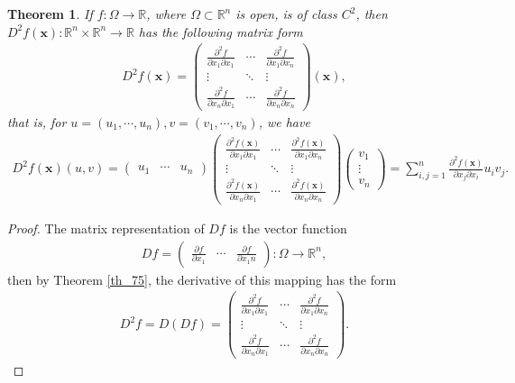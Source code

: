 \documentclass[10pt]{book}
\newtheorem{theorem}{Theorem}[chapter]
\theoremstyle{definition}
\numberwithin{equation}{chapter}
\begin{document}
\begin{theorem}\label{th_719}
If $f: \Omega \to \mathbb{R}$, where $\Omega \subset \mathbb{R}^n$ is open, is of class $C^2$, then $D^2f(\mathbf{x}): \mathbb{R}^n \times \mathbb{R}^n \to \mathbb{R}$ has the following matrix form
\begin{align*}
    D^2f(\mathbf{x}) = \begin{pmatrix}
        \frac{\partial^2 f}{\partial x_1 \partial x_1} & \cdots & \frac{\partial^2 f}{\partial x_1 \partial x_n} \\
        \vdots & \ddots & \vdots \\
        \frac{\partial^2 f}{\partial x_n \partial x_1} & \cdots & \frac{\partial^2 f}{\partial x_n \partial x_n}
    \end{pmatrix}(\mathbf{x}),
\end{align*}
that is, for $u = (u_1, \cdots, u_n),  v = (v_1, \cdots, v_n)$, we have
\begin{align*}
    D^2f(\mathbf{x})(u,v) = \begin{pmatrix}
        u_1 & \cdots & u_n    
    \end{pmatrix} 
    \begin{pmatrix}
        \frac{\partial^2 f(\mathbf{x})}{\partial x_1 \partial x_1} & \cdots & \frac{\partial^2 f(\mathbf{x})}{\partial x_1 \partial x_n} \\
        \vdots & \ddots & \vdots \\
        \frac{\partial^2 f(\mathbf{x})}{\partial x_n \partial x_1} & \cdots & \frac{\partial^2 f(\mathbf{x})}{\partial x_n \partial x_n}
    \end{pmatrix} 
    \begin{pmatrix}
        v_1 \\
        \vdots \\
        v_n
    \end{pmatrix} = \sum^n_{i,j=1} \frac{\partial^2 f(\mathbf{x})}{\partial x_j \partial x_i} u_i v_j.
\end{align*}
\end{theorem}
\begin{proof}
The matrix representation of $Df$ is the vector function
\begin{align*}
    Df = \begin{pmatrix}
        \frac{\partial f}{\partial x_1} & \cdots & \frac{\partial f}{\partial x_1n}
    \end{pmatrix}: \Omega \to \mathbb{R}^n,
\end{align*}
then by Theorem \ref{th_75}, the derivative of this mapping has the form
\begin{align}\label{th_719_equ1}
    D^2f = D(Df) = \begin{pmatrix}
        \frac{\partial^2 f}{\partial x_1 \partial x_1} & \cdots & \frac{\partial^2 f}{\partial x_1 \partial x_n} \\
        \vdots & \ddots & \vdots \\
        \frac{\partial^2 f}{\partial x_n \partial x_1} & \cdots & \frac{\partial^2 f}{\partial x_n \partial x_n}
    \end{pmatrix}.
\end{align}
\end{proof}
\end{document}
